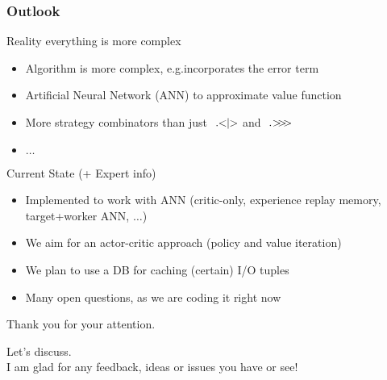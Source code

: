 \documentclass[xcolor=table%
,t]{beamer}
\begin{document}

\begin{frame}
  \frametitle{Outlook}
  
  \begin{block}{Reality everything is more complex}
    \begin{itemize}
    \item Algorithm is more complex, e.g.\@ incorporates the error term
    \item Artificial Neural Network (ANN) to approximate value function
    \item More strategy combinators than just \(\ .\hspace{-3.0pt}<\hspace{-3.0pt}|\hspace{-3.0pt}>\) and \(\ .\hspace{-2.5pt}>\hspace{-3.0pt}>\hspace{-3.0pt}>\) 
    \item \(\ldots\)
    \end{itemize}\pause
  \end{block}

  \begin{block}{Current State (+ Expert info)}
  \begin{itemize}
  \item Implemented to work with ANN (critic-only, experience replay memory, target+worker ANN, \(\ldots\))
  \item We aim for an actor-critic approach (policy and value iteration)
  \item We plan to use a DB for caching (certain) I/O tuples 
  \item Many open questions, as we are coding it right now
  \end{itemize}\pause

  \end{block}

\end{frame}

\begin{frame}
  \vspace{2.5cm}
  \begin{block}{}
    \centering
    Thank you for your attention. 
  \end{block}
  \begin{center}
    Let's discuss. \\I am glad for any feedback, ideas or issues you have or see!
  \end{center}

\end{frame}

\appendix

\begin{frame}

\end{frame}
\end{document}

